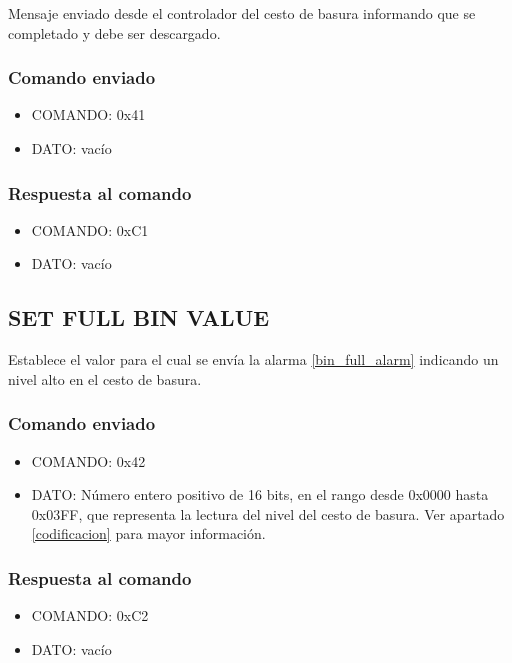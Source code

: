 \documentclass[a4paper,10pt]{article}
\begin{document}
Mensaje enviado desde el controlador del cesto de basura informando que se completado y debe ser descargado.

\subsubsection*{Comando enviado}

\begin{itemize}
	\item{COMANDO:} 0x41
	\item{DATO:} vac\'io
\end{itemize}

\subsubsection*{Respuesta al comando}

\begin{itemize}
	\item{COMANDO:} 0xC1
	\item{DATO:} vac\'io
\end{itemize}

\subsection{SET FULL BIN VALUE}
\label{set_battery_empty_value}

Establece el valor para el cual se env\'ia la alarma \ref{bin_full_alarm} indicando un nivel alto en el cesto de basura.

\subsubsection*{Comando enviado}

\begin{itemize}
	\item{COMANDO:} 0x42
	\item{DATO:} N\'umero entero positivo de 16 bits, en el rango desde 0x0000 hasta 0x03FF,
		que representa la lectura del nivel del cesto de basura.
		Ver apartado \ref{codificacion} para mayor informaci\'on.
\end{itemize}

\subsubsection*{Respuesta al comando}

\begin{itemize}
	\item{COMANDO:} 0xC2
	\item{DATO:} vac\'io
\end{itemize}
\end{document}
